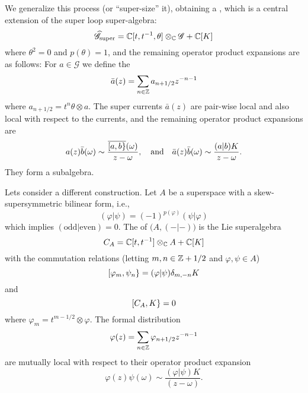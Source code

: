 \M
We generalize this process (or ``super-size'' it), obtaining
a , which is a central extension of the super
loop super-algebra:
\begin{equation}
\widehat{\mathscr{G}}_{\text{super}}=\mathbb{C}[t,t^{-1},\theta]\otimes_{\mathbb{C}}\mathscr{G}+\mathbb{C}[K]
\end{equation}
where $\theta^2=0$ and $p(\theta)=1$, and the remaining operator product
expansions are as follows: For $a\in\mathscr{G}$ we define
the 
\begin{equation}
\bar{a}(z)=\sum_{n\in\mathbb{Z}}a_{n+1/2}z^{-n-1}
\end{equation}
where $a_{n+1/2}=t^{n}\theta\otimes a$. The super currents $\bar{a}(z)$
are pair-wise local and also local with respect to the currents, and the
remaining operator product expansions are
\begin{equation}
a(z)\bar{b}(\omega)\sim\frac{\overline{[a,b\}}(\omega)}{z-\omega},
\quad\mbox{and}\quad
\bar{a}(z)\bar{b}(\omega)\sim\frac{(a|b)K}{z-\omega}.
\end{equation}
They form a subalgebra.

\M
Lets consider a different construction. Let $A$ be a superspace with a
skew-supersymmetric bilinear form, i.e., 
\begin{equation}
(\varphi|\psi)=(-1)^{p(\varphi)}(\psi|\varphi)
\end{equation}
which implies $(\mbox{odd}|\mbox{even})=0$. The  of $\bigl(A,(-|-)\bigr)$ is the Lie superalgebra
\begin{equation}
C_{A}=\mathbb{C}[t,t^{-1}]\otimes_{\mathbb{C}}A + \mathbb{C}[K]
\end{equation}
with the commutation relations (letting $m,n\in\mathbb{Z}+1/2$ and
$\varphi,\psi\in A$)
\begin{equation}
[\varphi_{m},\psi_{n}\}=(\varphi|\psi)\delta_{m,-n}K
\end{equation}
and
\begin{equation}
[C_{A},K\}=0
\end{equation}
where $\varphi_{m}=t^{m-1/2}\otimes\varphi$. The formal distribution 
\begin{equation}
\varphi(z)=\sum_{n\in\mathbb{Z}}\varphi_{n+1/2}z^{-n-1}
\end{equation}
are mutually local with respect to their operator product expansion
\begin{equation}
\varphi(z)\psi(\omega)\sim\frac{(\varphi|\psi)K}{(z-\omega)}.
\end{equation}

